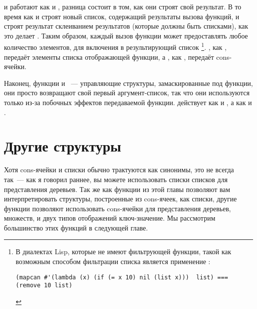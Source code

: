  и  работают как  и , разница состоит
в том, как они строят свой результат. В то время как  и  строят
новый список, содержащий результаты вызова функций,  и  строят
результат склеиванием результатов (которые должны быть списками), как это делает
. Таким образом, каждый вызов функции может предоставлять любое количество
элементов, для включения в результирующий список \footnote{В диалектах Lisp, которые не
  имеют фильтрующей функции, такой как  возможным способом фильтрации списка
  является применение :

\begin{lstlisting}
(mapcan #'(lambda (x) (if (= x 10) nil (list x)))  list) === (remove 10 list)
\end{lstlisting}

}. , как , передаёт элементы списка отображающей функции, а
, как , передаёт cons-ячейки.

Наконец, функции  и ~--- управляющие структуры, замаскированные под
функции, они просто возвращают свой первый аргумент-список, так что они используются
только из-за побочных эффектов передаваемой функции.  действует как
 и , а  как  и .


\section{Другие структуры}

Хотя cons-ячейки и списки обычно трактуются как синонимы, это не всегда так~--- как я
говорил раннее, вы можете использовать списки списков для представления деревьев. Так же
как функции из этой главы позволяют вам интерпретировать структуры, построенные из
cons-ячеек, как списки, другие функции позволяют использовать cons-ячейки для
представления деревьев, множеств, и двух типов отображений ключ-значение. Мы рассмотрим
большинство этих функций в следующей главе.


